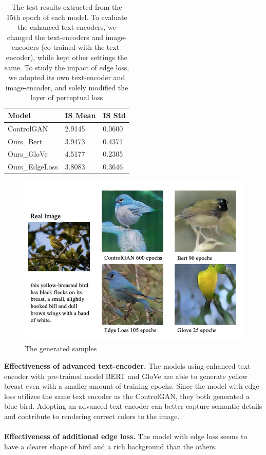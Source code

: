 \documentclass[10pt,twocolumn,letterpaper]{article}
\begin{document}
\begin{table}[htp]
    \centering
    \begin{tabular}{lll}
    \toprule
      \textbf{Model}   &\textbf{IS Mean }  & \textbf{IS Std}\\
      \midrule
      ControlGAN \cite{li2019controllable}   &2.9145 & 0.0600\\
      \midrule
      Ours\_Bert & 3.9473 & 0.4371 \\ 
      \midrule
      Ours\_GloVe & 4.5177& 0.2305 \\ 
      \midrule
      Ours\_EdgeLoss & 3.8083 & 0.3646 \\
      \bottomrule
    \end{tabular}
    \label{test}
    \vspace{3mm}
    \caption{The test results extracted from  the  15th  epoch  of  each  model. To evaluate the enhanced text encoders, we changed the text-encoders and image-encoders (co-trained with the text-encoder), while kept other  settings  the  same. To study the impact of edge loss, we adopted its own text-encoder and image-encoder, and solely modified the layer of perceptual loss }
    
\end{table}
\begin{figure}[htp]
    \centering
    \includegraphics[width=0.95\columnwidth]{fig/samples.jpeg}
    \caption{The generated samples}
    \label{sample}
\end{figure}
\noindent \textbf{Effectiveness of advanced text-encoder.} The models using enhanced text encoder with pre-trained model BERT and GloVe are able to generate yellow breast even with a smaller amount of training epochs. Since the model with edge loss utilizes the same text encoder as the ControlGAN, they both generated a blue bird. Adopting an advanced text-encoder can better capture semantic details and contribute to rendering correct colors to the image.
\\\\
\noindent \textbf{Effectiveness of additional edge loss.} The model with edge loss seems to have a clearer shape of bird and a rich background than the others.
\\\\
\end{document}
